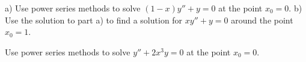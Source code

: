 \documentclass[12pt]{book}
\begin{document}
\begin{exercise}
a) Use power series methods to solve $(1-x)y''+y = 0$ at the point $x_0 = 0$.
b) Use the solution to part a) to find a solution
for $xy''+y=0$ around the point $x_0=1$.
\end{exercise}

\setcounter{exercise}{100}

\begin{exercise}
Use power series methods to solve $y'' + 2 x^3 y = 0$ at the point $x_0 =
0$.
\end{exercise}
\end{document}
